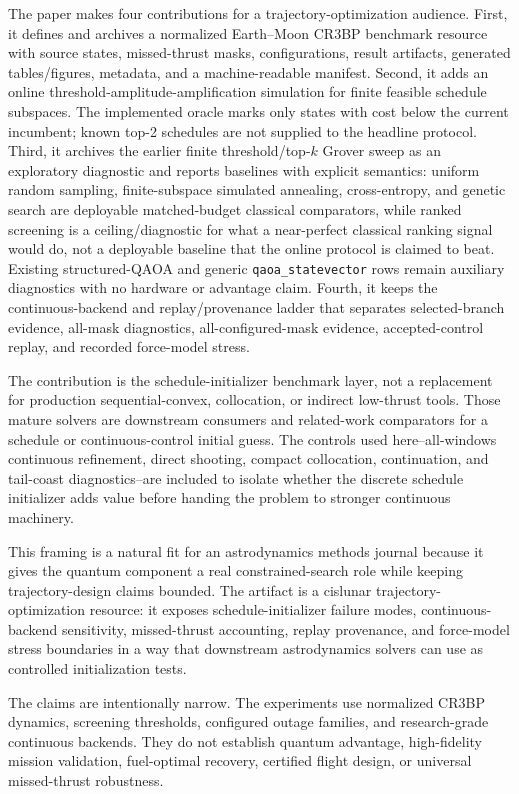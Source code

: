 \documentclass[preprint,12pt]{elsarticle}
\begin{document}
The paper makes four contributions for a trajectory-optimization audience.
First, it defines and archives a normalized Earth--Moon CR3BP benchmark resource with source states, missed-thrust masks, configurations, result artifacts, generated tables/figures, metadata, and a machine-readable manifest.
Second, it adds an online threshold-amplitude-amplification simulation for finite feasible schedule subspaces. The implemented oracle marks only states with cost below the current incumbent; known top-2 schedules are not supplied to the headline protocol.
Third, it archives the earlier finite threshold/top-$k$ Grover sweep as an exploratory diagnostic and reports baselines with explicit semantics: uniform random sampling, finite-subspace simulated annealing, cross-entropy, and genetic search are deployable matched-budget classical comparators, while ranked screening is a ceiling/diagnostic for what a near-perfect classical ranking signal would do, not a deployable baseline that the online protocol is claimed to beat. Existing structured-QAOA and generic \texttt{qaoa\_statevector} rows remain auxiliary diagnostics with no hardware or advantage claim.
Fourth, it keeps the continuous-backend and replay/provenance ladder that separates selected-branch evidence, all-mask diagnostics, all-configured-mask evidence, accepted-control replay, and recorded force-model stress.

The contribution is the schedule-initializer benchmark layer, not a replacement for production sequential-convex, collocation, or indirect low-thrust tools. Those mature solvers are downstream consumers and related-work comparators for a schedule or continuous-control initial guess. The controls used here--all-windows continuous refinement, direct shooting, compact collocation, continuation, and tail-coast diagnostics--are included to isolate whether the discrete schedule initializer adds value before handing the problem to stronger continuous machinery.

This framing is a natural fit for an astrodynamics methods journal because it gives the quantum component a real constrained-search role while keeping trajectory-design claims bounded. The artifact is a cislunar trajectory-optimization resource: it exposes schedule-initializer failure modes, continuous-backend sensitivity, missed-thrust accounting, replay provenance, and force-model stress boundaries in a way that downstream astrodynamics solvers can use as controlled initialization tests.

The claims are intentionally narrow. The experiments use normalized CR3BP dynamics, screening thresholds, configured outage families, and research-grade continuous backends. They do not establish quantum advantage, high-fidelity mission validation, fuel-optimal recovery, certified flight design, or universal missed-thrust robustness.
\end{document}
